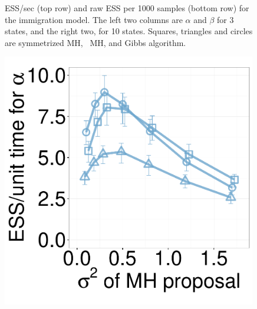 \begin{figure}[H]
\begin{minipage}[hp]{0.24\linewidth}
	\end{minipage}
    \caption{ESS/sec (top row) and raw ESS per 1000 samples (bottom row) for the immigration model. The left two columns are $\alpha$ and $\beta$ for 3 states, and the right two, for 10 states.
    Squares, triangles and circles are symmetrized MH, \naive\ MH, and Gibbs algorithm. }
     \label{fig:ESS_Q_D10}
  \end{figure}

  \begin{figure}[H]
  \centering
  \begin{minipage}[!hp]{0.24\linewidth}
  \centering
    \includegraphics [width=0.99\textwidth, angle=0]{figs/new_whole_exp_figs/mh_q_alpha_dim3.pdf}
\end{minipage}
  \begin{minipage}[hp]{0.24\linewidth}
  \centering

\end{minipage}
\end{figure}
